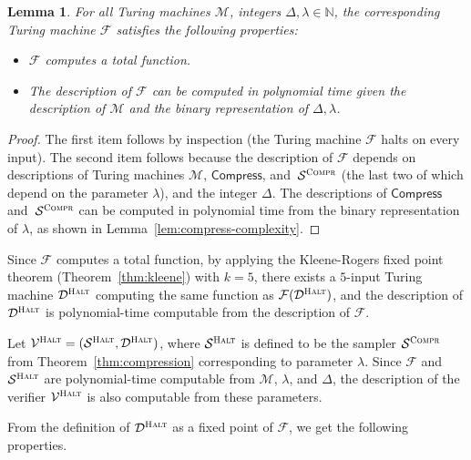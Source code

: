 \documentclass[11pt]{article}
\newtheorem{lemma}[theorem]{Lemma}
\theoremstyle{definition}
\newcommand{\N}{\ensuremath{\mathbb{N}}}
\newcommand{\sampler}{\mathcal{S}}
\newcommand{\decider}{\mathcal{D}}
\newcommand{\verifier}{\mathcal{V}}
\newcommand{\compr}{\textsc{Compr}}
\newcommand{\halt}{\textsc{Halt}}
\renewcommand{\cal}[1]{\mathcal{#1}}
\newcommand{\tmstyle}[1]{\ensuremath{\mathsf{#1}}}
\newcommand{\Compress}{\tmstyle{Compress}}
\begin{document}
\begin{lemma}
  \label{lem:F-computability}
  For all Turing machines $\cal{M}$, integers $\Delta, \lambda \in \N$, the
  corresponding Turing machine $\cal{F}$ satisfies the following properties:
  \begin{itemize}
  \item $\cal{F}$ computes a total function.
	\item The description of $\cal{F}$ can be computed in polynomial time given
    the description of $\cal{M}$ and the binary representation of $\Delta,
    \lambda$.
  \end{itemize}
\end{lemma}
\begin{proof}
	The first item follows by inspection (the Turing machine $\cal{F}$ halts on
  every input).
  The second item follows because the description of $\cal{F}$ depends on
  descriptions of Turing machines $\cal{M}$, $\Compress$, and~$\sampler^\compr$
  (the last two of which depend on the parameter $\lambda$), and the integer
  $\Delta$.
  The descriptions of $\Compress$ and~$\sampler^\compr$ can be computed in
  polynomial time from the binary representation of $\lambda$, as shown in
  Lemma~\ref{lem:compress-complexity}.
\end{proof}

Since $\cal{F}$ computes a total function, by applying the Kleene-Rogers fixed
point theorem (Theorem~\ref{thm:kleene}) with $k = 5$, there exists a $5$-input
Turing machine $\decider^\halt$ computing the same function as
$\cal{F}(\decider^\halt)$, and the description of $\decider^\halt$ is
polynomial-time computable from the description of $\cal{F}$.

Let $\verifier^\halt = (\sampler^\halt,\decider^\halt)$, where $\sampler^\halt$
is defined to be the sampler $\sampler^\compr$ from
Theorem~\ref{thm:compression} corresponding to parameter $\lambda$.
Since $\cal{F}$ and $\sampler^\halt$ are polynomial-time computable from
$\cal{M}$, $\lambda$, and $\Delta$, the description of the verifier
$\verifier^\halt$ is also computable from these parameters.

From the definition of $\decider^\halt$ as a fixed point of $\cal{F}$, we get
the following properties.
\end{document}
